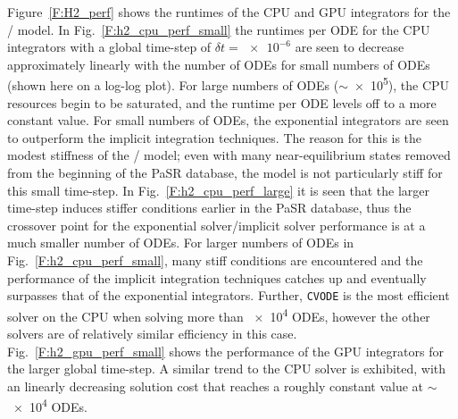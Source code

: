 \documentclass[final,twocolumn]{elsarticle}
\begin{document}
Figure~\ref{F:H2_perf} shows the runtimes of the CPU and GPU integrators for the \slash{} model.
In Fig.~\ref{F:h2_cpu_perf_small} the runtimes per ODE for the CPU integrators with a global time-step of $\delta t=\num{e-6}$ are seen to decrease approximately linearly with the number of ODEs for small numbers of ODEs (shown here on a log-log plot).
For large numbers of ODEs ($\sim$\num{e5}), the CPU resources begin to be saturated, and the runtime per ODE levels off to a more constant value.
For small numbers of ODEs, the exponential integrators are seen to outperform the implicit integration techniques.
The reason for this is the modest stiffness of the \slash{} model; even with many near-equilibrium states removed from the beginning of the PaSR database, the model is not particularly stiff for this small time-step.
In Fig.~\ref{F:h2_cpu_perf_large} it is seen that the larger time-step induces stiffer conditions earlier in the PaSR database, thus the crossover point for the exponential solver\slash implicit solver performance is at a much smaller number of ODEs.
For larger numbers of ODEs in Fig.~\ref{F:h2_cpu_perf_small}, many stiff conditions are encountered and the performance of the implicit integration techniques catches up and eventually surpasses that of the exponential integrators.
Further, \texttt{CVODE} is the most efficient solver on the CPU when solving more than \num{e4} ODEs, however the other solvers are of relatively similar efficiency in this case.
Fig.~\ref{F:h2_gpu_perf_small} shows the performance of the GPU integrators for the larger global time-step.
A similar trend to the CPU solver is exhibited, with an linearly decreasing solution cost that reaches a roughly constant value at $\sim$\num{e4} ODEs.
\end{document}
